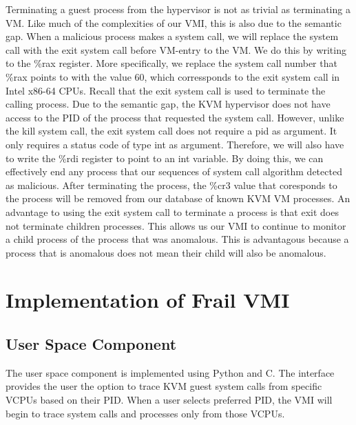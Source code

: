 \documentclass{report}
\begin{document}
\begin{spacing}{1.5}
{\large
Terminating a guest process from the hypervisor is not as trivial as terminating a VM. Like much of the complexities of our VMI, this is also due to the semantic gap. When a malicious process makes a system call, we will replace the system call with the exit system call before VM-entry to the VM. We do this by writing to the \%rax register. More specifically, we replace the system call number that \%rax points to with the value 60, which corressponds to the exit system call in Intel x86-64 CPUs. Recall that the exit system call is used to terminate the calling process. Due to the semantic gap, the KVM hypervisor does not have access to the PID of the process that requested the system call. However, unlike the kill system call, the exit system call does not require a pid as argument. It only requires a status code of type int as argument. Therefore, we will also have to write the \%rdi register to point to an int variable. By doing this, we can effectively end any process that our sequences of system call algorithm detected as malicious. After terminating the process, the \%cr3 value that coresponds to the process will be removed from our database of known KVM VM processes. An advantage to using the exit system call to terminate a process is that exit does not terminate children processes. This allows us our VMI to continue to monitor a child process of the process that was anomalous. This is advantagous because a process that is anomalous does not mean their child will also be anomalous.
\newline
}










\chapter{Implementation of Frail VMI}


\section{User Space Component}

The user space component is implemented using Python and C. The interface provides the user the option to trace KVM guest system calls from specific VCPUs based on their PID. When a user selects preferred PID, the VMI will begin to trace system calls and processes only from those VCPUs.




\end{spacing}
\end{document}
